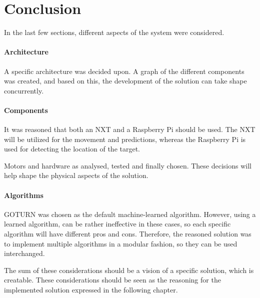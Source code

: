 \section{Conclusion}
In the last few sections, different aspects of the system were considered.

\paragraph{Architecture}
A specific architecture was decided upon.
A graph of the different components was created, and based on this, the development of the solution can take shape concurrently.


\paragraph{Components}
It was reasoned that both an NXT and a Raspberry Pi should be used.
The NXT will be utilized for the movement and predictions, whereas the Raspberry Pi is used for detecting the location of the target.


Motors and hardware as analysed, tested and finally chosen.
These decisions will help shape the physical aspects of the solution.


\paragraph{Algorithms}
GOTURN was chosen as the default machine-learned algorithm.
However, using a learned algorithm, can be rather ineffective in these cases, so each specific algorithm will have different pros and cons.
Therefore, the reasoned solution was to implement multiple algorithms in a modular fashion, so they can be used interchanged.


The sum of these considerations should be a vision of a specific solution, which is creatable.
These considerations should be seen as the reasoning for the implemented solution expressed in the following chapter.
